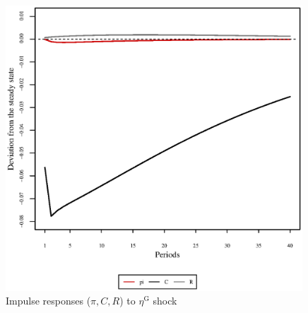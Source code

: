 \pagebreak

\begin{figure}[h]
\centering
\begin{minipage}{0.5\textwidth}
\vspace*{-3em}
\centering
\includegraphics[width=0.99\textwidth, scale=0.55]{plots/plot_140.eps}
\caption{Impulse responses ($\pi, C, R$) to $\eta^{\mathrm{G}}$ shock}
\end{minipage}
\end{figure}

